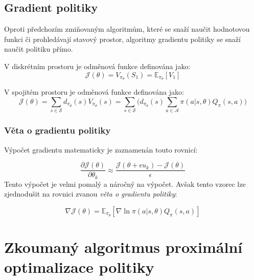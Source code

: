 \subsection{Gradient politiky}\label{subsec:gradient-politiky}
Oproti předchozím zmiňovaným algoritmům, které se snaží naučit hodnotovou funkci či prohledávají stavový prostor, algoritmy gradientu politiky se snaží naučit politiku přímo.

V diskrétním prostoru je odměnová funkce definována jako:
\begin{equation}
  \label{eq:odmenova_funkce}
  \mathcal{J}(\theta) = V_{\pi_\theta}(S_1) = \mathbb{E}_{\pi_\theta}[V_1]
\end{equation}

V spojitém prostoru je odměnová funkce definována jako:
\begin{equation}
    \label{eq:odmenova_funkce_spojita}
  \mathcal{J}(\theta) = \sum_{s \in \mathcal{S}} d_{\pi_\theta}(s) V_{\pi_\theta}(s) = \sum_{s \in \mathcal{S}} \Big( d_{\pi_\theta}(s) \sum_{a \in \mathcal{A}} \pi(a \vert s, \theta) Q_\pi(s, a) \Big)
  \end{equation}

\subsubsection*{Věta o gradientu politiky}
Výpočet gradientu matematicky je zaznamenán touto rovnicí:

\begin{equation}
  \label{eq:gradient_politiky}
  \frac{\partial \mathcal{J}(\theta)}{\partial \theta_k} \approx \frac{\mathcal{J}(\theta + \epsilon u_k) - \mathcal{J}(\theta)}{\epsilon}
\end{equation}
Tento výpočet je velmi pomalý a náročný na výpočet.
Avšak tento vzorec lze zjednodušit na rovnici zvanou \emph{věta o gradientu politiky}:

\begin{equation}
    \label{eq:veta_o_gradientu_politiky}
  \nabla \mathcal{J}(\theta) = \mathbb{E}_{\pi_\theta} [\nabla \ln \pi(a \vert s, \theta) Q_\pi(s, a)]
\end{equation}


\section{Zkoumaný algoritmus proximální optimalizace politiky}
\label{sec:proximalni-optimalizace-politiky}


